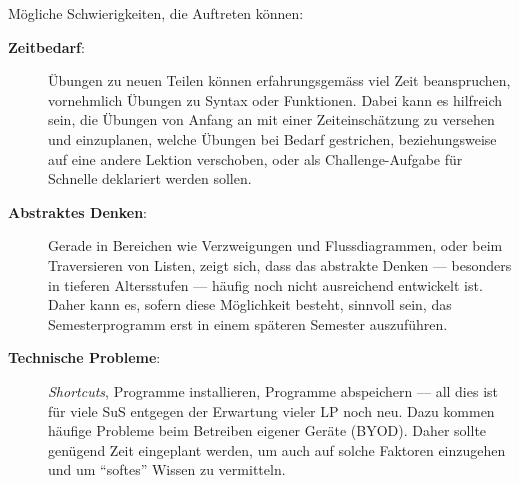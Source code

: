 Mögliche Schwierigkeiten, die Auftreten können:
\begin{description}
	\item[\textbf{Zeitbedarf}:] Übungen zu neuen Teilen können erfahrungsgemäss viel Zeit beanspruchen, vornehmlich Übungen zu Syntax oder Funktionen. Dabei kann es hilfreich sein, die Übungen von Anfang an mit einer Zeiteinschätzung zu versehen und einzuplanen, welche Übungen bei Bedarf gestrichen, beziehungsweise auf eine andere Lektion verschoben, oder als Challenge-Aufgabe für Schnelle deklariert werden sollen.
	\item[\textbf{Abstraktes Denken}:] Gerade in Bereichen wie Verzweigungen und Flussdiagrammen, oder beim Traversieren von Listen, zeigt sich, dass das abstrakte Denken --- besonders in tieferen Altersstufen --- häufig noch nicht ausreichend entwickelt ist. Daher kann es, sofern diese Möglichkeit besteht, sinnvoll sein, das Semesterprogramm erst in einem späteren Semester auszuführen.
	\item[\textbf{Technische Probleme}:] \textit{Shortcuts}, Programme installieren, Programme abspeichern --- all dies ist für viele SuS entgegen der Erwartung vieler LP noch neu. Dazu kommen häufige Probleme beim Betreiben eigener Geräte (BYOD). Daher sollte genügend Zeit eingeplant werden, um auch auf solche Faktoren einzugehen und um \enquote{softes} Wissen zu vermitteln.
\end{description}

\clearpage
